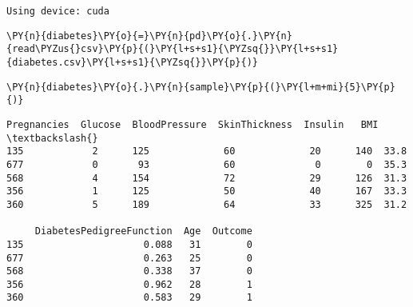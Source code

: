     \begin{Verbatim}[commandchars=\\\{\}]
Using device: cuda
    \end{Verbatim}

    \begin{tcolorbox}[breakable, size=fbox, boxrule=1pt, pad at break*=1mm,colback=cellbackground, colframe=cellborder]
\begin{Verbatim}[commandchars=\\\{\}]
\PY{n}{diabetes}\PY{o}{=}\PY{n}{pd}\PY{o}{.}\PY{n}{read\PYZus{}csv}\PY{p}{(}\PY{l+s+s1}{\PYZsq{}}\PY{l+s+s1}{diabetes.csv}\PY{l+s+s1}{\PYZsq{}}\PY{p}{)}
\end{Verbatim}
\end{tcolorbox}

    \begin{tcolorbox}[breakable, size=fbox, boxrule=1pt, pad at break*=1mm,colback=cellbackground, colframe=cellborder]
\begin{Verbatim}[commandchars=\\\{\}]
\PY{n}{diabetes}\PY{o}{.}\PY{n}{sample}\PY{p}{(}\PY{l+m+mi}{5}\PY{p}{)}
\end{Verbatim}
\end{tcolorbox}

            \begin{tcolorbox}[breakable, size=fbox, boxrule=.5pt, pad at break*=1mm, opacityfill=0]
\begin{Verbatim}[commandchars=\\\{\}]
     Pregnancies  Glucose  BloodPressure  SkinThickness  Insulin   BMI  \textbackslash{}
135            2      125             60             20      140  33.8
677            0       93             60              0        0  35.3
568            4      154             72             29      126  31.3
356            1      125             50             40      167  33.3
360            5      189             64             33      325  31.2

     DiabetesPedigreeFunction  Age  Outcome
135                     0.088   31        0
677                     0.263   25        0
568                     0.338   37        0
356                     0.962   28        1
360                     0.583   29        1
\end{Verbatim}
\end{tcolorbox}
        
